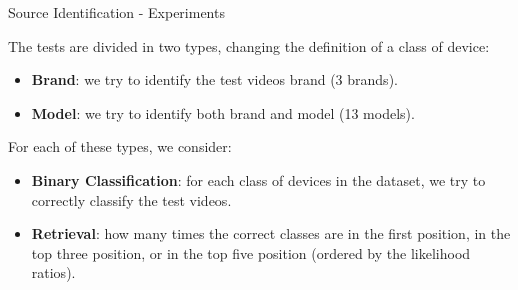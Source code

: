 \begin{tframe}{Source Identification - Experiments}
\vspace{0.2cm}

The tests are divided in two types, changing the definition of a class of device:

\begin{itemize}
\item \textbf{Brand}: we try to identify the test videos brand (3 brands).
\vspace{0.1cm}
\item \textbf{Model}: we try to identify both brand and model (13 models).
\end{itemize}
\vspace{0.2cm}

For each of these types, we consider:

\begin{itemize}
\item \textbf{Binary Classification}: for each class of devices in the dataset, we try to correctly classify the test videos.
\vspace{0.1cm}
\item \textbf{Retrieval}: how many times the correct classes are in the first position, in the top three position, or in the top five position (ordered by the likelihood ratios).
\end{itemize}

\end{tframe}

